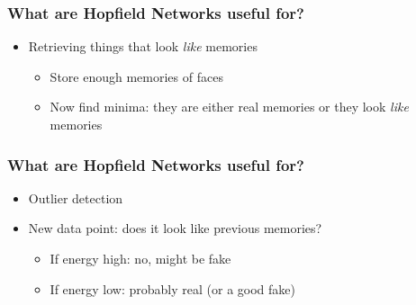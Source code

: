 \documentclass{beamer}
\begin{document}
\begin{frame}
\frametitle{What are Hopfield Networks useful for?}
\begin{itemize}
    \item Retrieving things that look \emph{like} memories
    \begin{itemize}
        \item Store enough memories of faces
        \item Now find minima: they are either real memories or they look \emph{like} memories
    \end{itemize}
\end{itemize}
\end{frame}

\begin{frame}
\frametitle{What are Hopfield Networks useful for?}
\begin{itemize}
    \item Outlier detection
    \item New data point: does it look like previous memories?
    \begin{itemize}
        \item If energy high: no, might be fake
        \item If energy low: probably real (or a good fake)
    \end{itemize}
\end{itemize}
\end{frame}
\end{document}
